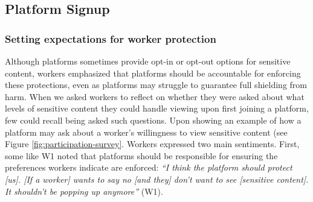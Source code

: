 

\subsection{Platform Signup}
\subsubsection{Setting expectations for worker protection}
Although platforms sometimes provide opt-in or opt-out options for sensitive content, workers emphasized that platforms should be accountable for enforcing these protections, even as platforms may struggle to guarantee full shielding from harm. When we asked workers to reflect on whether they were asked about what levels of sensitive content they could handle viewing upon first joining a platform, few could recall being asked such questions. Upon showing an example of how a platform may ask about a worker's willingness to view sensitive content (see Figure \ref{fig:participation-survey}. Workers expressed two main sentiments. First, some like W1 noted that platforms should be responsible for ensuring the preferences workers indicate are enforced: \textit{``I think the platform should protect [us]. [If a worker] wants to say no [and they] don't want to see [sensitive content]. It shouldn't be popping up anymore''} (W1). 

